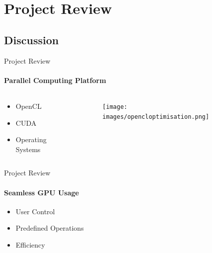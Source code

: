 \section{Project Review}

	\subsection{Discussion}
	\begin{frame}[t]{Project Review}\framesubtitle{Parallel Computing Platform}
	\begin{columns}[T]
	\begin{column}{0.48\textwidth}
		\begin{itemize}
			\item OpenCL
			\item CUDA
			\item Operating Systems
		\end{itemize}
	\end{column}
	\begin{column}{.48\textwidth}
      \begin{figure}
         \texttt{[image: images/opencloptimisation.png]}
      \end{figure}
    \end{column}
    \end{columns}
	\end{frame}

	\begin{frame}[t]{Project Review}\framesubtitle{Seamless GPU Usage}
		\begin{itemize}
			\item User Control
			\item Predefined Operations
			\item Efficiency
		\end{itemize}
	\end{frame}

